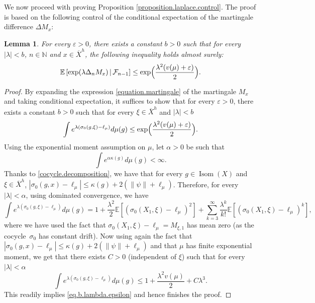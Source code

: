 \documentclass[JEP,XML,SOM,Unicode,published]{cedram}
\let\epsilon\varepsilon
\theoremstyle{plain}
\newtheorem{lemma}[theorem]{Lemma}
\theoremstyle{definition}
\newcommand\E{\mathbb{E}}
\newcommand\N{\mathbb{N}}
\DeclareMathOperator\Isom{Isom}
\begin{document}
We now proceed with proving Proposition \ref{proposition.laplace.control}. The proof is based on the following control of the conditional expectation of the martingale difference $\Delta M_x$:

\begin{lemma}\label{lemma.martingale.condition}
For every $\epsilon>0$,
there exists a constant $b>0$ such that for every $|\lambda|<b$, $n\in \N$ and $x\in \overline{X}^h$, the following inequality holds almost surely:
\begin{equation*}
\E\left[\exp(\lambda \Delta_n M_x)\,|\,\mathcal{F}_{n-1} \right]
\leq \exp\Bigl(\frac{\lambda^2 (v(\mu)+\epsilon)}{2}\Bigr).
\end{equation*}
\end{lemma}

\begin{proof}
By expanding the expression \eqref{equation.martingale} of the martingale $M_x$ and taking conditional expectation, it suffices to show that for every $\epsilon>0$, there exists a constant $b>0$ such that for every $\xi \in \overline{X}^h$ and $|\lambda|<b$
\begin{equation}\label{eq.b.lambda.epsilon}
\int e^{\lambda(\sigma_0(g,\xi)-\ell_\mu)} d\mu(g) \leq \exp\Bigl(\frac{\lambda^2 (v(\mu)+\epsilon)}{2}\Bigr).
\end{equation}
Using the exponential moment assumption on $\mu$, let $\alpha>0$ be such that
\[
\int e^{\alpha \kappa(g)}d\mu(g)<\infty.
\]
Thanks to \eqref{cocycle.decomposition}, we have that for every $g \in \Isom(X)$ and $\xi \in \overline{X}^h$, $|\sigma_0(g,x)-\ell_\mu| \leq \kappa(g) + 2(\|\psi\|+\ell_\mu)$. Therefore, for every $|\lambda|<\alpha$, using dominated convergence, we have
\[
\int e^{\lambda(\sigma_0(g,\xi)-\ell_\mu)} d\mu(g)=1+\frac{\lambda^2}{2}\E[(\sigma_0(X_1,\xi)-\ell_\mu)^2]+\sum_{k=3}^{\infty}\frac{\lambda^k}{k!}\E[(\sigma_0(X_1,\xi)-\ell_\mu)^k],
\]
where we have used the fact that $\sigma_0(X_1,\xi)\!-\!\ell_\mu\!=\!M_{\xi,1}$ has mean zero (as the cocycle~$\sigma_0$ has constant drift). Now using again the fact that $|\sigma_0(g,x)-\ell_\mu| \leq \kappa(g) + 2(\|\psi\|+\ell_\mu)$ and that $\mu$ has finite exponential moment, we get that there exists $C>0$ (independent of $\xi$) such that for every $|\lambda|<\alpha$
\[
\int e^{\lambda(\sigma_0(g,\xi)-\ell_\mu)} d\mu(g)\leq 1+\frac{\lambda^2 v(\mu)}{2}+ C \lambda^3.
\]
This readily implies \eqref{eq.b.lambda.epsilon} and hence finishes the proof.
\end{proof}
\end{document}
